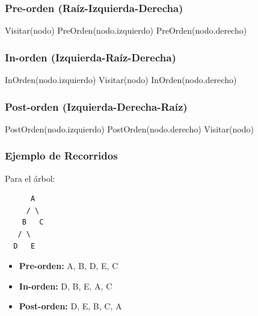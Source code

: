 \documentclass[12pt,a4paper]{article}
\begin{document}
\subsubsection{Pre-orden (Raíz-Izquierda-Derecha)}
\begin{algorithm}[H]
\caption{Recorrido Pre-orden}
\begin{algorithmic}
        \State Visitar(nodo)
        \State PreOrden(nodo.izquierdo)
        \State PreOrden(nodo.derecho)
    \EndIf
\EndProcedure
\end{algorithmic}
\end{algorithm}

\subsubsection{In-orden (Izquierda-Raíz-Derecha)}
\begin{algorithm}[H]
\caption{Recorrido In-orden}
\begin{algorithmic}
        \State InOrden(nodo.izquierdo)
        \State Visitar(nodo)
        \State InOrden(nodo.derecho)
    \EndIf
\EndProcedure
\end{algorithmic}
\end{algorithm}

\subsubsection{Post-orden (Izquierda-Derecha-Raíz)}
\begin{algorithm}[H]
\caption{Recorrido Post-orden}
\begin{algorithmic}
        \State PostOrden(nodo.izquierdo)
        \State PostOrden(nodo.derecho)
        \State Visitar(nodo)
    \EndIf
\EndProcedure
\end{algorithmic}
\end{algorithm}

\subsubsection{Ejemplo de Recorridos}
Para el árbol:
\begin{verbatim}
      A
     / \
    B   C
   / \
  D   E
\end{verbatim}

\begin{itemize}
    \item \textbf{Pre-orden:} A, B, D, E, C
    \item \textbf{In-orden:} D, B, E, A, C
    \item \textbf{Post-orden:} D, E, B, C, A
\end{itemize}
\end{document}
